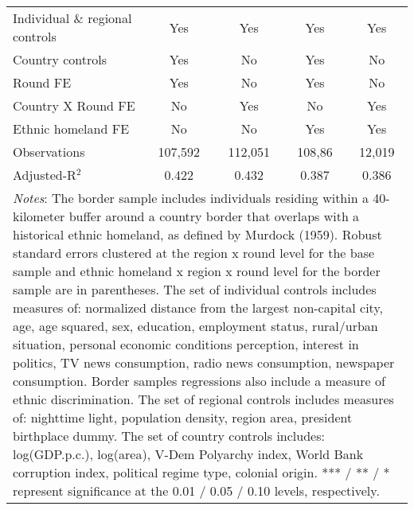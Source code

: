 \documentclass[11pt]{article}
\theoremstyle{plain}
\theoremstyle{plain}
\begin{document}
\begin{table}[H]
{\begin{tabular}{@{\extracolsep{5pt}} l c c c c}
\midrule
     \smallskip
    Individual \& regional controls  & Yes & Yes & Yes & Yes\\
    \smallskip
    Country controls & Yes& No& Yes& No\\
    \smallskip
    Round FE & Yes & No& Yes & No\\
    \smallskip
    Country X Round FE       & No & Yes& No & Yes\\
    \smallskip
    Ethnic homeland FE & No & No & Yes& Yes\\
    \smallskip
    Observations           &      107,592   &      112,051   &       108,86   &       12,019\\
    Adjusted-R$^2$          &       0.422   &       0.432   &       0.387   &       0.386\\
                          \bottomrule
    \multicolumn{5}{p{12cm}}{\footnotesize \emph{Notes}: The border sample includes individuals residing within a 40-kilometer buffer around a country border that overlaps with a historical ethnic homeland, as defined by Murdock (1959). Robust standard errors clustered at the region x round level  for the base sample and ethnic homeland x region x round level for the border sample are in parentheses. The set of individual controls
    includes measures of: normalized distance from the largest non-capital city, age, age squared, sex,
    education, employment status, rural/urban situation, personal economic conditions perception, interest in politics, TV news consumption, radio news consumption, newspaper consumption. Border samples regressions also include a measure of ethnic discrimination. The set of regional controls includes measures of: nighttime light, population density, region area, president birthplace dummy. The set of country controls includes: log(GDP.p.c.), log(area), V-Dem Polyarchy index, World Bank corruption index, political regime type, colonial origin. *** / ** / * represent significance at the 0.01 / 0.05 / 0.10 levels, respectively.}
    \end{tabular}
    }
    \end{table}
\end{document}
